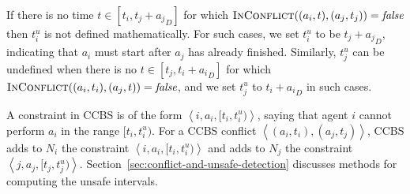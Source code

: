 \documentclass[review]{elsarticle}
\newcommand{\tuple}[1]{\ensuremath{\left \langle #1 \right \rangle }}
\newcommand\konstantin[1]{\nb{\textbf{Konstantin:}}{red}{#1}}
\newcommand\roni[1]{\nb{\textbf{Roni:}}{green}{#1}}
\newcommand{\ccbs}{\ac{CCBS}\xspace}
\newcommand{\false}{\textit{false}\xspace}
\newcommand{\inconflict}{\textsc{InConflict}\xspace}
\begin{document}
If there is no time $t\in[t_i,t_j+{a_j}_D]$ for which $\inconflict((a_i,t),(a_j,t_j))=\false$ then $t_i^u$ is not defined mathematically. 
For such cases, we set $t_i^u$ to be $t_j+{a_j}_D$, indicating that $a_i$ must start after $a_j$ has already finished. Similarly, 
$t_j^u$ can be undefined 
when there is no 
$t\in[t_j,t_i+{a_i}_D]$ for which $\inconflict((a_i,t_i),(a_j,t))=\false$, 
and we set $t_j^u$ to $t_i+{a_i}_D$ in such cases. 

A constraint in \ccbs is of the form $\tuple{i, a_i, [t_i, t^u_i)}$, saying that agent $i$ cannot perform $a_i$ in the range $[t_i,t^u_i)$. 
For a \ccbs conflict $\tuple{(a_i, t_i), (a_j, t_j)}$, \ccbs adds to $N_i$ the constraint $\tuple{i, a_i, [t_i,t^u_i)}$ and adds to $N_j$ the constraint $\tuple{j, a_j, [t_j,t^u_j)}$. 
Section~\ref{sec:conflict-and-unsafe-detection} discusses methods for computing the unsafe intervals. 
\end{document}
